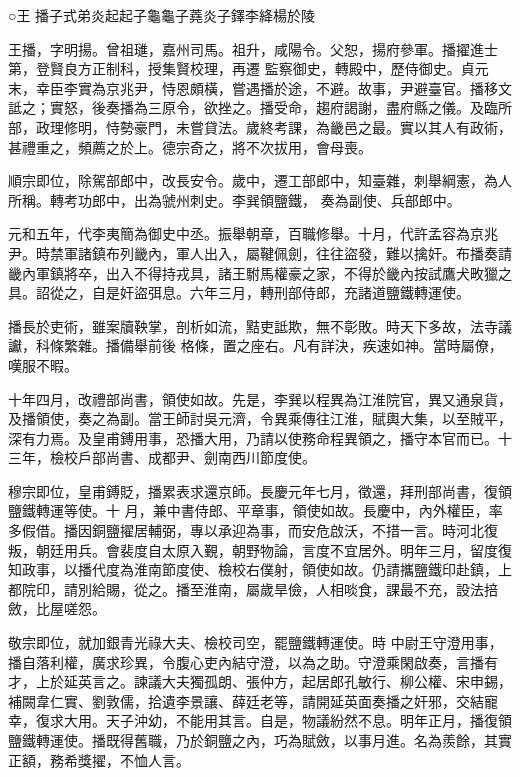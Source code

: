 
\begin{pinyinscope}

 ○王
 播子式弟炎起起子龜龜子蕘炎子鐸李絳楊於陵



 王播，字明揚。曾祖璡，嘉州司馬。祖升，咸陽令。父恕，揚府參軍。播擢進士第，登賢良方正制科，授集賢校理，再遷
 監察御史，轉殿中，歷侍御史。貞元末，幸臣李實為京兆尹，恃恩頗橫，嘗遇播於途，不避。故事，尹避臺官。播移文詆之；實怒，後奏播為三原令，欲挫之。播受命，趨府謁謝，盡府縣之儀。及臨所部，政理修明，恃勢豪門，未嘗貸法。歲終考課，為畿邑之最。實以其人有政術，甚禮重之，頻薦之於上。德宗奇之，將不次拔用，會母喪。



 順宗即位，除駕部郎中，改長安令。歲中，遷工部郎中，知臺雜，刺舉綱憲，為人所稱。轉考功郎中，出為虢州刺史。李巽領鹽鐵，
 奏為副使、兵部郎中。



 元和五年，代李夷簡為御史中丞。振舉朝章，百職修舉。十月，代許孟容為京兆尹。時禁軍諸鎮布列畿內，軍人出入，屬鞬佩劍，往往盜發，難以擒奸。布播奏請畿內軍鎮將卒，出入不得持戎具，諸王駙馬權豪之家，不得於畿內按試鷹犬畋獵之具。詔從之，自是奸盜弭息。六年三月，轉刑部侍郎，充諸道鹽鐵轉運使。



 播長於吏術，雖案牘鞅掌，剖析如流，黠吏詆欺，無不彰敗。時天下多故，法寺議讞，科條繁雜。播備舉前後
 格條，置之座右。凡有詳決，疾速如神。當時屬僚，嘆服不暇。



 十年四月，改禮部尚書，領使如故。先是，李巽以程異為江淮院官，異又通泉貨，及播領使，奏之為副。當王師討吳元濟，令異乘傳往江淮，賦輿大集，以至賊平，深有力焉。及皇甫鎛用事，恐播大用，乃請以使務命程異領之，播守本官而已。十三年，檢校戶部尚書、成都尹、劍南西川節度使。



 穆宗即位，皇甫鎛貶，播累表求還京師。長慶元年七月，徵還，拜刑部尚書，復領鹽鐵轉運等使。十
 月，兼中書侍郎、平章事，領使如故。長慶中，內外權臣，率多假借。播因銅鹽擢居輔弼，專以承迎為事，而安危啟沃，不措一言。時河北復叛，朝廷用兵。會裴度自太原入覲，朝野物論，言度不宜居外。明年三月，留度復知政事，以播代度為淮南節度使、檢校右僕射，領使如故。仍請攜鹽鐵印赴鎮，上都院印，請別給賜，從之。播至淮南，屬歲旱儉，人相啖食，課最不充，設法掊斂，比屋嗟怨。



 敬宗即位，就加銀青光祿大夫、檢校司空，罷鹽鐵轉運使。時
 中尉王守澄用事，播自落利權，廣求珍異，令腹心吏內結守澄，以為之助。守澄乘閑啟奏，言播有才，上於延英言之。諫議大夫獨孤朗、張仲方，起居郎孔敏行、柳公權、宋申錫，補闕韋仁實、劉敦儒，拾遺李景讓、薛廷老等，請開延英面奏播之奸邪，交結寵幸，復求大用。天子沖幼，不能用其言。自是，物議紛然不息。明年正月，播復領鹽鐵轉運使。播既得舊職，乃於銅鹽之內，巧為賦斂，以事月進。名為羨餘，其實正額，務希獎擢，不恤人言。




\end{pinyinscope}
